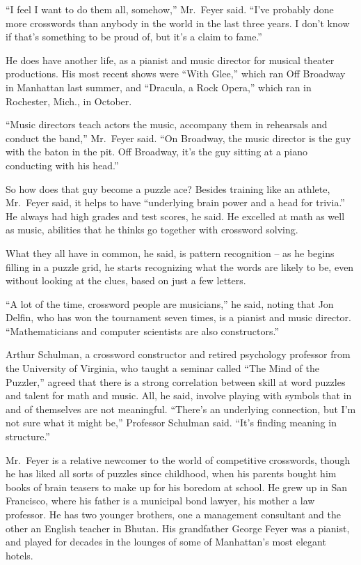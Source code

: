 ﻿\documentclass[12pt]{article}
\begin{document}
``I feel I want to do them all, somehow,'' Mr.~Feyer said. ``I've probably done more crosswords than
anybody in the world in the last three years. I don't know if that's something to be proud of, but
it's a claim to fame.''

He does have another life, as a pianist and music director for musical theater productions. His most
recent shows were ``With Glee,'' which ran Off Broadway in Manhattan last summer, and ``Dracula, a
Rock Opera,'' which ran in Rochester, Mich., in October.

``Music directors teach actors the music, accompany them in rehearsals and conduct the band,''
Mr.~Feyer said. ``On Broadway, the music director is the guy with the baton in the pit. Off
Broadway, it's the guy sitting at a piano conducting with his head.''

So how does that guy become a puzzle ace? Besides training like an athlete, Mr.~Feyer said, it helps
to have ``underlying brain power and a head for trivia.'' He always had high grades and test scores,
he said. He excelled at math as well as music, abilities that he thinks go together with crossword
solving.

What they all have in common, he said, is pattern recognition -- as he begins filling in a puzzle
grid, he starts recognizing what the words are likely to be, even without looking at the clues,
based on just a few letters.

``A lot of the time, crossword people are musicians,'' he said, noting that Jon Delfin, who has won
the tournament seven times, is a pianist and music director. ``Mathematicians and computer
scientists are also constructors.''

Arthur Schulman, a crossword constructor and retired psychology professor from the University of
Virginia, who taught a seminar called ``The Mind of the Puzzler,'' agreed that there is a strong
correlation between skill at word puzzles and talent for math and music. All, he said, involve
playing with symbols that in and of themselves are not meaningful. ``There's an underlying
connection, but I'm not sure what it might be,'' Professor Schulman said. ``It's finding meaning in
structure.''

Mr.~Feyer is a relative newcomer to the world of competitive crosswords, though he has liked all
sorts of puzzles since childhood, when his parents bought him books of brain teasers to make up for
his boredom at school. He grew up in San Francisco, where his father is a municipal bond lawyer, his
mother a law professor. He has two younger brothers, one a management consultant and the other an
English teacher in Bhutan. His grandfather George Feyer was a pianist, and played for decades in the
lounges of some of Manhattan's most elegant hotels.
\end{document}
